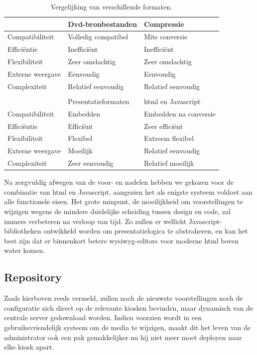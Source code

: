 \begin{table}[h!]
  \begin{center}
    \begin{tabular}{p{3cm} p{4cm} p{4cm}}
    & Dvd-bronbestanden & Compressie \\
    \hline
    Compatibiliteit & Volledig compatibel & Mits conversie \\
    Efficiëntie & Inefficiënt & Inefficiënt \\
    Flexibiliteit & Zeer omslachtig & Zeer omslachtig \\
    Externe weergave & Eenvoudig & Eenvoudig \\
    Complexiteit & Relatief eenvoudig & Relatief eenvoudig \\
    \\    
    & Presentatieformaten & \ac{html} en Javascript \\
    \hline
    Compatibiliteit & Embedden & Embedden na conversie \\
    Efficiëntie & Efficiënt & Zeer efficiënt \\
    Flexibiliteit & Flexibel & Extreem flexibel \\
    Externe weergave & Moeilijk & Relatief eenvoudig \\
    Complexiteit & Zeer eenvoudig & Relatief moeilijk \\
    \end{tabular}
  \end{center}
  \caption{Vergelijking van verschillende formaten.}
\end{table}

Na zorgvuldig afwegen van de voor- en nadelen hebben we gekozen voor de combinatie van \ac{html} en Javascript, aangezien het als enigste systeem voldoet aan alle functionele eisen. Het grote minpunt, de moeilijkheid om voorstellingen te wijzigen wegens de mindere duidelijke scheiding tussen design en code, zal immers verbeteren na verloop van tijd. Zo zullen er wellicht Javascript-bibliotheken ontwikkeld worden om presentatielogica te abstraheren, en kan het best zijn dat er binnenkort betere \ac{wysiwyg}-editors voor moderne \ac{html} boven water komen.

\subsection{Repository}

Zoals hierboven reeds vermeld, zullen noch de nieuwste voorstellingen noch de configuratie zich direct op de relevante kiosken bevinden, maar dynamisch van de centrale server gedownload worden. Indien voorzien wordt in een gebruiksvriendelijk systeem om de media te wijzigen, maakt dit het leven van de administrator ook een pak gemakkelijker nu hij niet meer moet deployen naar elke kiosk apart.

